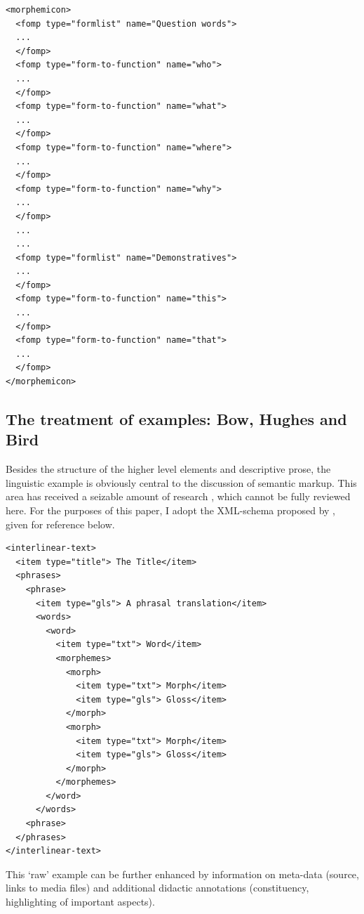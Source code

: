 \documentclass[a4paper,12pt]{article}
\begin{document}
\ea\label{xml:morphemicon}
\begin{verbatim}
<morphemicon>
  <fomp type="formlist" name="Question words">
  ...
  </fomp>
  <fomp type="form-to-function" name="who">
  ...
  </fomp>
  <fomp type="form-to-function" name="what">
  ...
  </fomp>
  <fomp type="form-to-function" name="where">
  ...
  </fomp>
  <fomp type="form-to-function" name="why">
  ...
  </fomp>
  ...
  ...
  <fomp type="formlist" name="Demonstratives">
  ...
  </fomp>
  <fomp type="form-to-function" name="this">
  ...
  </fomp>
  <fomp type="form-to-function" name="that">
  ...
  </fomp>
</morphemicon>
\end{verbatim}
\z


\subsection{The treatment of examples: Bow, Hughes and Bird}

Besides the structure of the higher level elements and descriptive prose, the linguistic example is obviously central to the discussion of semantic markup. This area has received a seizable amount of research \citep{Drude2002,Peterson2002,BowEtAl2003}, which cannot be fully reviewed here. For the purposes of this paper, I adopt the XML-schema proposed by \citet{BowEtAl2003}, given for reference below.

\ea\label{xml:bbh}
\begin{verbatim}
<interlinear-text>
  <item type="title"> The Title</item>
  <phrases>
    <phrase>
      <item type="gls"> A phrasal translation</item>
      <words>
        <word>
          <item type="txt"> Word</item>
          <morphemes>
            <morph>
              <item type="txt"> Morph</item>
              <item type="gls"> Gloss</item>
            </morph>
            <morph>
              <item type="txt"> Morph</item>
              <item type="gls"> Gloss</item>
            </morph>
          </morphemes>
        </word>
      </words>
    <phrase>
  </phrases>
</interlinear-text>
\end{verbatim}
\z

This `raw' example can be further enhanced by information on meta-data (source, links to media files) and additional didactic annotations (constituency, highlighting of important aspects)\citep{Good2004}.
\end{document}
